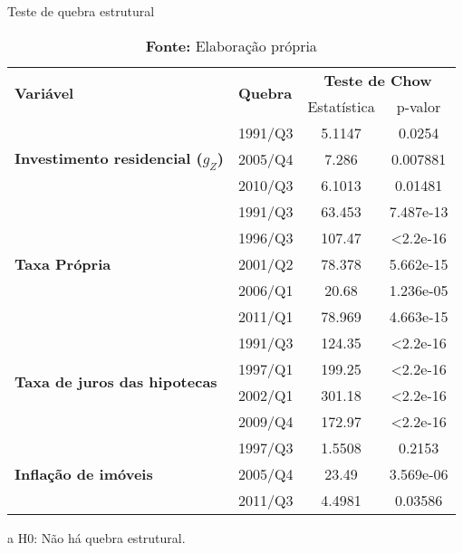 \begin{table}[H]
	\centering
	\caption{Teste de quebra estrutural}
	\label{structbreak}
	\begin{threeparttable}
		\begin{tabular}{l|l|cc}
			\hline \hline
			\multirow{2}{*}{\textbf{Variável}} & \multirow{2}{*}{\textbf{Quebra}} & \multicolumn{2}{c}{\textbf{Teste de Chow}\tnote{a}} \\ \cline{3-4} 
			&& Estatística & p-valor \\ \hline
			\multirow{3}{*}{\textbf{Investimento residencial ($g_Z$)}} & 1991/Q3 & 5.1147 & 0.0254 \\
			& 2005/Q4 & 7.286 & 0.007881 \\
			& 2010/Q3 & 6.1013 & 0.01481 \\ \hline
			\multirow{5}{*}{\textbf{Taxa Própria}} & 1991/Q3 & 63.453 & 7.487e-13 \\
			& 1996/Q3 & 107.47 & \textless 2.2e-16 \\
			& 2001/Q2 & 78.378 & 5.662e-15 \\
			& 2006/Q1 & 20.68 & 1.236e-05 \\
			& 2011/Q1 & 78.969 & 4.663e-15 \\ \hline
			\multirow{4}{*}{\textbf{Taxa de juros das hipotecas}} & 1991/Q3 & 124.35 & \textless 2.2e-16 \\
			& 1997/Q1 & 199.25 & \textless 2.2e-16 \\
			& 2002/Q1 & 301.18 & \textless 2.2e-16 \\
			& 2009/Q4 & 172.97 & \textless 2.2e-16 \\ \hline
			\multirow{3}{*}{\textbf{Inflação de imóveis}} & 1997/Q3 & 1.5508 & 0.2153 \\
			& 2005/Q4 & 23.49 & 3.569e-06 \\
			& 2011/Q3 & 4.4981 & 0.03586 \\ 
			\hline \hline
		\end{tabular}%
	\begin{tablenotes}\footnotesize
		\item [a] H0: Não há quebra estrutural.
	\end{tablenotes}
\end{threeparttable}
	\caption*{\textbf{Fonte:} Elaboração própria}
\end{table}
